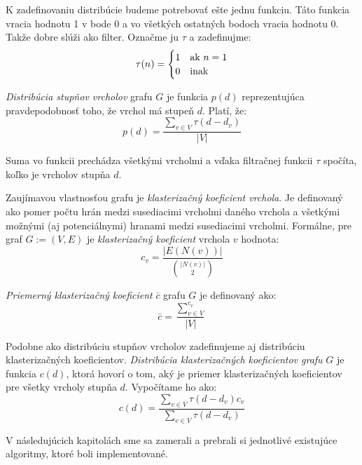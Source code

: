 K zadefinovaniu distribúcie budeme potrebovať ešte jednu funkciu. Táto funkcia 
vracia hodnotu 1 v bode 0 a vo všetkých ostatných bodoch vracia hodnotu 0. 
Takže dobre slúži ako filter. Označme ju $\tau$ a zadefinujme: 
$$\tau (n) = \begin{cases}
\hfill 1 \hfill & \text{ak $n=1$} \\
\hfill 0 \hfill & \text{inak} \\
\end{cases}$$

\emph{Distribúcia stupňov vrcholov} grafu $G$ je funkcia 
$p(d)$ reprezentujúca pravdepodobnosť toho, že vrchol má stupeň $d$. Platí, že: 
$$p(d) = \frac{\sum_{v \in V}^{}{\tau(d - d_v)}}{|V|}$$

Suma vo funkcii prechádza všetkými vrcholmi a vďaka filtračnej funkcii $\tau$ 
spočíta, koľko je vrcholov stupňa $d$.

Zaujímavou vlastnosťou grafu je \emph{klasterizačný koeficient vrchola}. Je 
definovaný ako pomer počtu hrán medzi susediacimi vrcholmi daného vrchola a 
všetkými možnými (aj potenciálnymi) hranami medzi susediacimi vrcholmi. 
Formálne, pre graf $G := (V, E)$ je \emph{klasterizačný koeficient} vrchola 
$v$ hodnota: $$c_v = \frac{|E(N(v))|}{\binom{|N(v)|}{2}}$$

\emph{Priemerný klasterizačný koeficient} $\bar{c}$ grafu $G$ je definovaný ako:
$$\bar{c} = \frac{\sum_{v\in V}^{c_v}}{|V|}$$

Podobne ako distribúciu stupňov vrcholov zadefinujeme aj distribúciu 
klasterizačných koeficientov. \emph{Distribúcia klasterizačných koeficientov 
grafu} $G$ je funkcia $c(d)$, ktorá hovorí o tom, aký je priemer
klasterizačných koeficientov pre všetky vrcholy stupňa $d$. Vypočítame ho ako: 
$$c(d) = \frac{\sum_{v \in V}^{}{\tau(d - d_v)c_v}}
{\sum_{v \in V}^{}{\tau(d - d_v)}}$$


V následujúcich kapitolách sme sa zamerali a prebrali si jednotlivé existujúce 
algoritmy, ktoré boli implementované.

